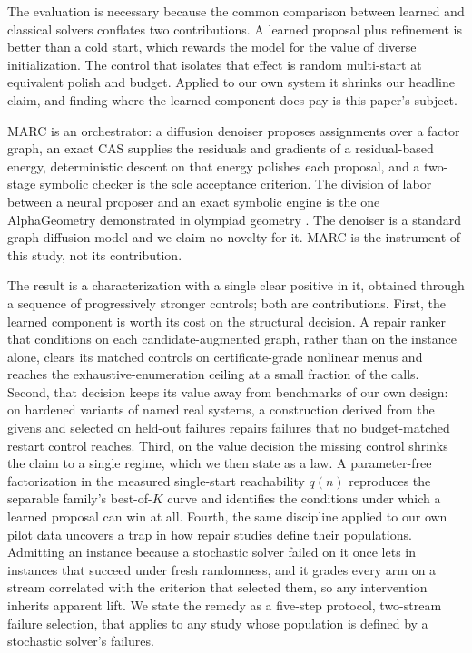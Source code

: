 \documentclass[letterpaper]{article} %
\begin{document}
The evaluation is necessary because the common comparison between learned and classical
solvers conflates two contributions. A learned proposal plus refinement is better than a cold
start, which rewards the model for the value of diverse initialization. The control that
isolates that effect is random multi-start at equivalent polish and budget. Applied to our own
system it shrinks our headline claim, and finding where the learned component does pay is this
paper's subject.

MARC is an orchestrator: a diffusion denoiser proposes assignments over a factor graph, an
exact CAS supplies the residuals and gradients of a residual-based energy, deterministic
descent on that energy polishes each proposal, and a two-stage symbolic checker is the sole
acceptance criterion. The division of labor between a neural proposer and an exact symbolic
engine is the one AlphaGeometry demonstrated in olympiad geometry
\citep{trinh2024alphageometry}. The denoiser is a standard graph diffusion model and we
claim no novelty for it. MARC is the instrument of this study, not its contribution.

The result is a characterization with a single clear positive in it, obtained through a
sequence of progressively stronger controls; both are contributions. First, the learned
component is worth its cost on the structural decision. A repair ranker that conditions on
each candidate-augmented graph, rather than on the instance alone, clears its matched controls
on certificate-grade nonlinear menus and reaches the exhaustive-enumeration ceiling at a small
fraction of the calls. Second, that decision keeps its value away from benchmarks of our own
design: on hardened variants of named real systems, a construction derived from the givens and
selected on held-out failures repairs failures that no budget-matched restart control reaches.
Third, on the value decision the missing control shrinks the claim to a single regime, which
we then state as a law. A parameter-free factorization in the measured single-start
reachability $q(n)$ reproduces the separable family's best-of-$K$ curve and identifies the
conditions under which a learned proposal can win at all. Fourth, the same discipline applied
to our own pilot data uncovers a trap in how repair studies define their populations.
Admitting an instance because a stochastic solver failed on it once lets in instances that
succeed under fresh randomness, and it grades every arm on a stream correlated with the
criterion that selected them, so any intervention inherits apparent lift. We state the remedy
as a five-step protocol, two-stream failure selection, that applies to any study whose
population is defined by a stochastic solver's failures.
\end{document}
